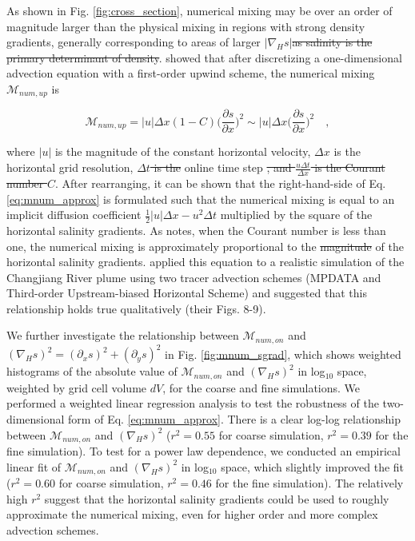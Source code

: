 \documentclass[draft]{agujournal2019}
\providecommand{\DIFadd}[1]{{\protect\color{blue}\uwave{#1}}} %
\providecommand{\DIFdel}[1]{{\protect\color{red}\sout{#1}}}                      %
\providecommand{\DIFaddbegin}{} %
\providecommand{\DIFaddend}{} %
\providecommand{\DIFdelbegin}{} %
\providecommand{\DIFdelend}{} %
\begin{document}
As shown in Fig. \ref{fig:cross_section}, numerical mixing may be over an order of magnitude larger than the physical mixing in regions with strong density gradients, generally corresponding to areas of larger $|\nabla_H s|$\DIFdelbegin \DIFdel{as salinity is the primary determinant of density}\DIFdelend .  showed that after discretizing a one-dimensional advection equation with a first-order upwind scheme, the numerical mixing $\mathcal{M}_{num, up}$ is
\begin{linenomath*}
\begin{equation} \label{eq:mnum_approx}
    \mathcal{M}_{num, up} = |u|\Delta x (1-C) \bigg(\frac{\partial s}{\partial x} \bigg)^2 \sim |u|\Delta x \bigg(\frac{\partial s}{\partial x} \bigg)^2 \quad ,
\end{equation}
\end{linenomath*}
where $|u|$ is the magnitude of the constant horizontal velocity, $\Delta x$ is the horizontal grid resolution, \DIFdelbegin \DIFdel{$\Delta t$ is the }\DIFdelend \DIFaddbegin \DIFadd{$C=\frac{u \Delta t}{\Delta x}$ is the Courant number with }\DIFaddend online time step \DIFdelbegin \DIFdel{, and $\frac{u \Delta t}{\Delta x}$ is the Courant number $C$}\DIFdelend \DIFaddbegin \DIFadd{$\Delta t$}\DIFaddend . After rearranging, it can be shown that the right-hand-side of Eq. \ref{eq:mnum_approx} is formulated such that the numerical mixing is equal to an implicit diffusion coefficient \DIFdelbegin \DIFdel{$\frac{1}{2}|u|\Delta x-u^2 \Delta t$ }\DIFdelend \DIFaddbegin \DIFadd{$|u|\Delta x-u^2 \Delta t$ }\DIFaddend multiplied by the square of the horizontal salinity gradients. As  notes, when the Courant number is less than one, the numerical mixing is approximately proportional to the \DIFdelbegin \DIFdel{magnitude }\DIFdelend \DIFaddbegin \DIFadd{square }\DIFaddend of the horizontal salinity gradients.  applied this equation to a realistic simulation of the Changjiang River plume using two tracer advection schemes (MPDATA and Third-order Upstream-biased Horizontal Scheme) and suggested that this relationship holds true qualitatively (their Figs. 8-9). 

We further investigate the relationship between $\mathcal{M}_{num, on}$ and $(\nabla_H s)^2 = (\partial_x s)^2+(\partial_y s)^2$ in Fig. \ref{fig:mnum_sgrad}, which shows weighted histograms of the absolute value of $\mathcal{M}_{num, on}$ and $(\nabla_H s)^2$ in log$_{10}$ space, weighted by grid cell volume $dV$, for the coarse and fine simulations. We performed a weighted linear regression analysis to test the robustness of the two-dimensional form of Eq. \ref{eq:mnum_approx}. There is a clear log-log relationship between $\mathcal{M}_{num, on}$ and $(\nabla_H s)^2$ ($r^2=0.55$ for coarse simulation, $r^2=0.39$ for the fine simulation). To test for a power law dependence, we conducted an empirical linear fit of $\mathcal{M}_{num, on}$ and $(\nabla_H s)^2$ in log$_{10}$ space, which slightly improved the fit ($r^2=0.60$ for coarse simulation, $r^2=0.46$ for the fine simulation). The relatively high $r^2$ suggest that the horizontal salinity gradients could be used to roughly approximate the numerical mixing, even for higher order and more complex advection schemes.
\end{document}
